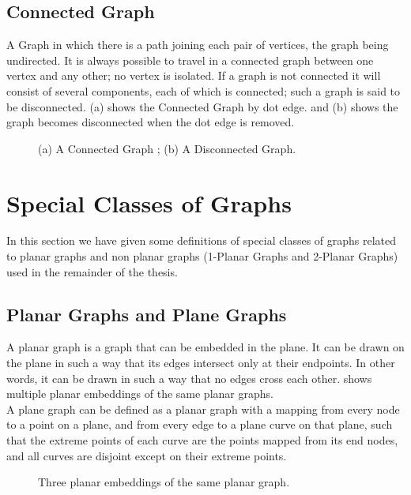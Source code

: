 \subsection{Connected Graph}
A Graph in which there is a path joining each pair of vertices, the graph being undirected. It is always possible to travel in a connected graph between one vertex and any other; no vertex is isolated. If a graph is not connected it will consist of several components, each of which is connected; such a graph is said to be disconnected. (a) shows the Connected Graph by dot edge. and (b) shows the graph becomes disconnected when the dot edge is removed.


\begin{figure}[!tb]
  \centering
\resizebox{150mm}{!}{}
\caption{(a) A Connected Graph ; (b) A Disconnected Graph.}
\label{fig:connectivity}
\end{figure}




\section{Special Classes of Graphs}
\label{special}

In this section we have given some definitions of special classes of graphs related
to planar graphs and non planar graphs (1-Planar Graphs and 2-Planar Graphs) used in the remainder of the thesis.


\subsection{Planar Graphs and Plane Graphs}

A planar graph is a graph that can be embedded in the plane. It can be drawn on the plane in such a way that its edges intersect only at their endpoints. In other words, it can be drawn in such a way that no edges cross each other.  shows multiple planar embeddings of the same planar graphs.
\\

A plane graph can be defined as a planar graph with a mapping from every node to a point on a plane, and from every edge to a plane curve on that plane, such that the extreme points of each curve are the points mapped from its end nodes, and all curves are disjoint except on their extreme points.

\begin{figure}[!tb]
  \centering
\resizebox{150mm}{!}{}
\caption{Three planar embeddings of the same planar graph.}
\label{fig:planar}
\end{figure}



